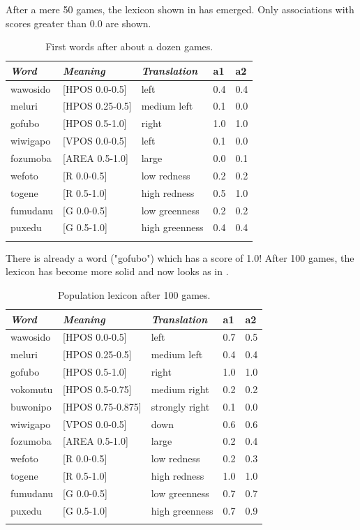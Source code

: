 After a mere 50 games, the lexicon shown in  has emerged. Only
associations with scores greater than 0.0 are shown. 
\begin{table}
\begin{center}
\begin{tabular}{ l  l  l  l  l }
\lsptoprule
{\it Word}&{\it Meaning}&{\it Translation} & {\bf a1}&{\bf a2} \\ \midrule
wawosido & [HPOS 0.0-0.5] &left&0.4&0.4\\ \midrule
meluri & [HPOS 0.25-0.5] &medium left&0.1&0.0\\ \midrule
gofubo & [HPOS 0.5-1.0]& right&1.0&1.0\\ \midrule
wiwigapo & [VPOS 0.0-0.5] &left&0.1&0.0\\ \midrule
fozumoba & [AREA 0.5-1.0]&large & 0.0&0.1\\ \midrule
wefoto & [R 0.0-0.5]& low redness &0.2&0.2\\ \midrule
togene & [R 0.5-1.0]& high redness &0.5&1.0\\ \midrule
fumudanu & [G 0.0-0.5]& low greenness &0.2&0.2\\ \midrule
puxedu & [G 0.5-1.0]& high greenness &0.4&0.4\\ \midrule
\lspbottomrule
\end{tabular}
\caption{\label{tab:game50} First words after about a dozen games.}
\end{center}
\end{table}
There is already a word ("gofubo") which has
a score of 1.0! After 100 games, the lexicon has become more 
solid and now looks as in . 
\begin{table}
\begin{center}
\begin{tabular}{ l  l  l  l  l }
\lsptoprule
{\it Word}&{\it Meaning}&{\it Translation} & {\bf a1}&{\bf a2} \\ \midrule
wawosido & [HPOS 0.0-0.5] &left&0.7&0.5\\ \midrule
meluri & [HPOS 0.25-0.5] &medium left&0.4&0.4\\ \midrule
gofubo & [HPOS 0.5-1.0]& right&1.0&1.0\\ \midrule
vokomutu & [HPOS 0.5-0.75] &medium right&0.2&0.2\\ \midrule
buwonipo & [HPOS 0.75-0.875] &strongly right&0.1&0.0\\ \midrule
wiwigapo & [VPOS 0.0-0.5] &down&0.6&0.6\\ \midrule
fozumoba & [AREA 0.5-1.0]&large & 0.2&0.4\\ \midrule
wefoto & [R 0.0-0.5]& low redness &0.2&0.3\\ \midrule
togene & [R 0.5-1.0]& high redness &1.0&1.0\\ \midrule
fumudanu & [G 0.0-0.5]& low greenness &0.7&0.7\\ \midrule
puxedu & [G 0.5-1.0]& high greenness &0.7&0.9\\ \midrule
\lspbottomrule
\end{tabular}
\caption{\label{tab:goubo} Population lexicon after 100 games.}
\end{center}
\end{table}


